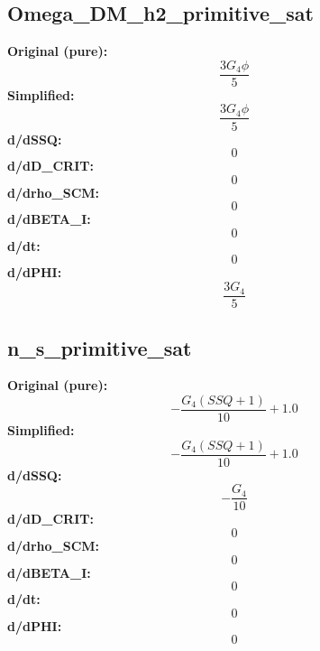 \subsection{Omega_DM_h2_primitive_sat}
\textbf{Original (pure):}
\begin{equation}
\frac{3 G_{4} \phi}{5}
\end{equation}
\textbf{Simplified:}
\begin{equation}
\frac{3 G_{4} \phi}{5}
\end{equation}
\textbf{d/dSSQ:}
\begin{equation}
0
\end{equation}
\textbf{d/dD_CRIT:}
\begin{equation}
0
\end{equation}
\textbf{d/drho_SCM:}
\begin{equation}
0
\end{equation}
\textbf{d/dBETA_I:}
\begin{equation}
0
\end{equation}
\textbf{d/dt:}
\begin{equation}
0
\end{equation}
\textbf{d/dPHI:}
\begin{equation}
\frac{3 G_{4}}{5}
\end{equation}

\subsection{n_s_primitive_sat}
\textbf{Original (pure):}
\begin{equation}
- \frac{G_{4} \left(SSQ + 1\right)}{10} + 1.0
\end{equation}
\textbf{Simplified:}
\begin{equation}
- \frac{G_{4} \left(SSQ + 1\right)}{10} + 1.0
\end{equation}
\textbf{d/dSSQ:}
\begin{equation}
- \frac{G_{4}}{10}
\end{equation}
\textbf{d/dD_CRIT:}
\begin{equation}
0
\end{equation}
\textbf{d/drho_SCM:}
\begin{equation}
0
\end{equation}
\textbf{d/dBETA_I:}
\begin{equation}
0
\end{equation}
\textbf{d/dt:}
\begin{equation}
0
\end{equation}
\textbf{d/dPHI:}
\begin{equation}
0
\end{equation}

